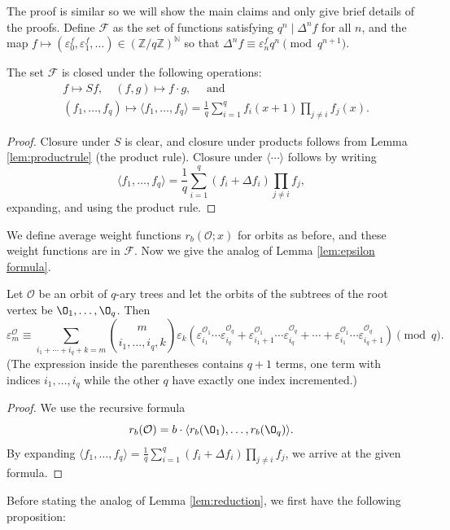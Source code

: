 The proof is similar so we will show the main claims and only give brief details of the proofs. Define $\mathcal{F}$ as the set of functions satisfying $q^n\mid \Delta^n f$ for all $n$, and the map $f\mapsto (\varepsilon_0^f, \varepsilon_1^f, \dotsc)\in (\mathbb{Z}/q\mathbb{Z})^{\mathbb{N}}$ so that $\Delta^n f\equiv \varepsilon^f_nq^n\pmod{q^{n+1}}$.

\begin{lemma}
The set $\mathcal{F}$ is closed under the following operations:
\begin{align*}
    &f\mapsto Sf, \quad (f, g)\mapsto f\cdot g, \quad \text{ and } \\
    &(f_1,\dotsc, f_q)\mapsto \langle f_1, \dotsc, f_q\rangle = \frac{1}{q}\sum_{i=1}^{q}f_i(x+1)\prod_{j\neq i}f_j(x).
\end{align*}
\end{lemma}
\begin{proof}
    Closure under $S$ is clear, and closure under products follows from Lemma \ref{lem:productrule} (the product rule). Closure under $\langle \dotsb\rangle$ follows by writing
    \[\langle f_1, \dotsc, f_q\rangle =\frac{1}{q}\sum_{i=1}^{q}(f_i+\Delta f_i)\prod_{j\neq i}f_j,\]
    expanding, and using the product rule.
\end{proof}
We define average weight functions $r_b(\mathcal{O}; x)$ for orbits as before, and these weight functions are in $\mathcal{F}$. Now we give the analog of Lemma \ref{lem:epsilon formula}.

\begin{lemma}
\label{lem:qepsilonformula}
Let $\mathcal{O}$ be an orbit of $q$-ary trees and let the orbits of the subtrees of the root vertex be $\O_1, \dotsc, \O_q$. Then
\[\varepsilon^{\mathcal{O}}_{m} \equiv\sum_{i_1+\dotsb+i_q+k=m}\binom{m}{i_1, \dotsc, i_q, k}\varepsilon_{k}(\varepsilon^{\mathcal{O}_1}_{i_1}\dotsm\varepsilon^{\mathcal{O}_q}_{i_q}+\varepsilon^{\mathcal{O}_1}_{i_1+1}\dotsm\varepsilon^{\mathcal{O}_q}_{i_q}+\dotsb+\varepsilon^{\mathcal{O}_1}_{i_1}\dotsm\varepsilon^{\mathcal{O}_q}_{i_q+1})\pmod{q}.\]
(The expression inside the parentheses contains $q+1$ terms, one term with indices $i_1, \dotsc, i_q$ while the other $q$ have exactly one index incremented.)
\end{lemma}
\begin{proof}
We use the recursive formula
\[r_b(\mathcal{O})=b\cdot \langle r_b(\O_1), \dotsc, r_b(\O_q)\rangle.\]
By expanding $\langle f_1, \dotsc, f_q\rangle =\frac{1}{q}\sum_{i=1}^{q}(f_i+\Delta f_i)\prod_{j\neq i}f_j$, we arrive at the given formula.
\end{proof}
Before stating the analog of Lemma \ref{lem:reduction}, we first have the following proposition:

